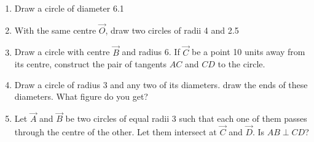 \renewcommand{\theequation}{\theenumi}
\begin{enumerate}[label=\arabic*.,ref=\thesubsection.\theenumi]

\item Draw a circle of diameter 6.1

\item With the same centre $\vec{O}$,  draw two circles of radii 4 and 2.5
\item Draw a circle with centre $\vec{B}$ and radius 6.  If $\vec{C}$ be  a point 10 units  away from its 
centre, construct the pair of tangents $AC$ and $CD$ to the 
circle.
\item Draw a circle of radius 3 and any two of its diameters.  draw the ends of these diameters. What figure do you get?
\item Let $\vec{A}$ and $\vec{B}$ be two circles of equal radii 3 such that each one of them passes through the centre of the other.  Let them intersect at $\vec{C}$ and $\vec{D}$.  Is $AB \perp CD$?


\end{enumerate}

